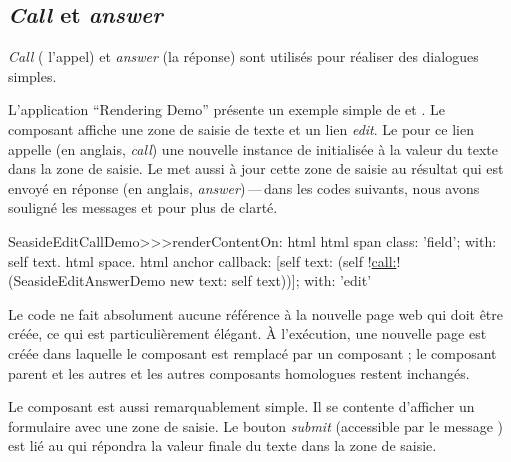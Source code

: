 \documentclass[a4paper,10pt,twoside]{book}
\begin{document}
\subsection{\emph{Call} et \emph{answer}}

\emph{Call} (\cad{} l'appel) et \emph{answer} (\cad la réponse) sont utilisés
pour réaliser des dialogues simples.

L'application ``Rendering Demo'' présente un exemple simple de
 et .
Le composant  affiche une zone de saisie de
texte et un lien \emph{edit}.
Le \callback pour ce lien appelle (en anglais, \emph{call}) une nouvelle instance de
 initialisée à la valeur du texte dans la
zone de saisie.
Le \callback met aussi à jour cette zone de saisie au résultat qui est
envoyé en réponse (en anglais, \emph{answer})\,---\,dans les codes
suivants, nous avons souligné les messages  et
 pour plus de clarté. %

\begin{code}{}
SeasideEditCallDemo>>>renderContentOn: html
	html span
		class: 'field';
		with: self text.
	html space.
	html anchor
		callback: [self text: (self !\underline{call:}! (SeasideEditAnswerDemo new text: self text))];
		with: 'edit'
\end{code}{}

Le code ne fait absolument aucune référence à la nouvelle page web qui
doit être créée, ce qui est particulièrement élégant.
À l'exécution, une nouvelle page est créée dans laquelle le composant
 est remplacé par un composant
; le composant parent et les autres et les
autres composants homologues restent inchangés.


Le composant  est aussi remarquablement simple.
Il se contente d'afficher un formulaire avec une zone de saisie.
Le bouton \emph{submit} 
(\brush accessible par le message )
est lié au \callback qui répondra la valeur finale du texte dans la
zone de saisie.
\end{document}
